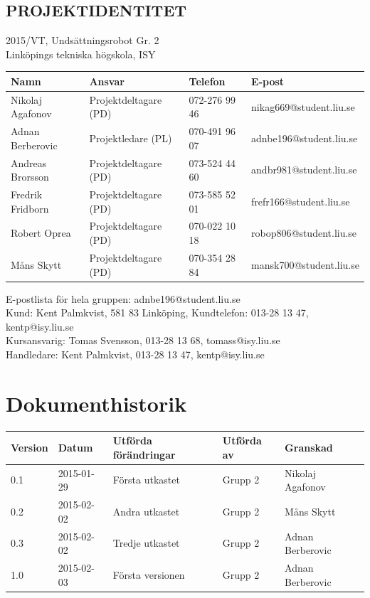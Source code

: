 \documentclass[11pt]{article}
\begin{document}
\pagebreak
\begin{center}

\section*{PROJEKTIDENTITET}
2015/VT, Undsättningsrobot Gr. 2
\\
Linköpings tekniska högskola, ISY
\\[0.5in]
\begin{table}[h]
\begin{tabular}{|l|l|l|l|} \hline
Namn & Ansvar & Telefon & E-post \\[0.1in] \hline
Nikolaj Agafonov & Projektdeltagare (PD) & 072-276 99 46 & nikag669@student.liu.se \\ \hline
Adnan Berberovic & Projektledare (PL) & 070-491 96 07 & adnbe196@student.liu.se \\ \hline
Andreas Brorsson & Projektdeltagare (PD) & 073-524 44 60 & andbr981@student.liu.se \\ \hline
Fredrik Fridborn & Projektdeltagare (PD) & 073-585 52 01 & frefr166@student.liu.se \\ \hline
Robert Oprea & Projektdeltagare (PD) & 070-022 10 18 & robop806@student.liu.se \\ \hline
Måns Skytt & Projektdeltagare (PD) & 070-354 28 84 & mansk700@student.liu.se \\ \hline
\end{tabular}
\end{table}

E-postlista för hela gruppen: adnbe196@student.liu.se
\\[1in]
Kund: Kent Palmkvist, 581 83 Linköping,
Kundtelefon: 013-28 13 47, kentp@isy.liu.se
\\[1in]
Kursansvarig: Tomas Svensson, 013-28 13 68, tomass@isy.liu.se
\\
Handledare: Kent Palmkvist, 013-28 13 47, kentp@isy.liu.se
\end{center}
\pagebreak

\tableofcontents

\pagebreak

\section*{Dokumenthistorik}
\begin{table}[h]
\begin{tabular}{|l|l|l|l|l|} \hline

Version & 
Datum & 
Utförda förändringar & 
Utförda av & 
Granskad \\[0.1in] \hline
0.1 &
2015-01-29 & 
Första utkastet & 
Grupp 2 & 
Nikolaj Agafonov \\ \hline
0.2 &
2015-02-02 &
Andra utkastet &
Grupp 2 &
Måns Skytt \\ \hline
0.3 &
2015-02-02 &
Tredje utkastet &
Grupp 2 &
Adnan Berberovic \\ \hline
1.0 &
2015-02-03 &
Första versionen &
Grupp 2 &
Adnan Berberovic \\ \hline
\end{tabular}
\end{table}
\end{document}

